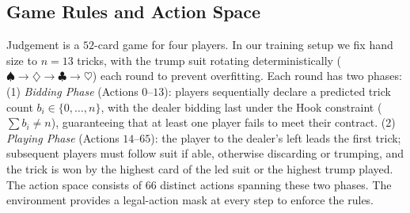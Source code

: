 \documentclass[conference]{IEEEtran}
\begin{document}
\begin{table}[htbp]
\centering
\caption{\normalsize Observation Space Decomposition (454 Features)}
\label{tab:obsspace}
\end{table}
 
\subsection{\textbf{Game Rules and Action Space}}
 
Judgement is a $52$-card game for four players. In our training setup we fix hand size to $n=13$ tricks, with the trump suit rotating deterministically ($\spadesuit \rightarrow \diamondsuit \rightarrow \clubsuit \rightarrow \heartsuit$) each round to prevent overfitting. Each round has two phases: (1) \textit{Bidding Phase} (Actions $0$--$13$): players sequentially declare a predicted trick count $b_i \in \{0,\dots,n\}$, with the dealer bidding last under the Hook constraint ($\sum b_i \neq n$), guaranteeing that at least one player fails to meet their contract. (2) \textit{Playing Phase} (Actions $14$--$65$): the player to the dealer's left leads the first trick; subsequent players must follow suit if able, otherwise discarding or trumping, and the trick is won by the highest card of the led suit or the highest trump played. The action space consists of $66$ distinct actions spanning these two phases. The environment provides a legal-action mask at every step to enforce the rules.
 
\end{document}
